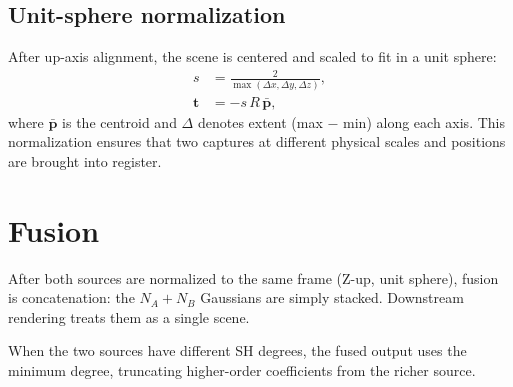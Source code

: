 \documentclass[11pt]{article}
\begin{document}
\subsection{Unit-sphere normalization}

After up-axis alignment, the scene is centered and scaled to fit in a
unit sphere:
\begin{align}
  s &= \frac{2}{\max(\Delta x, \Delta y, \Delta z)}, \\
  \mathbf{t} &= -s \, R \, \bar{\mathbf{p}},
\end{align}
where $\bar{\mathbf{p}}$ is the centroid and $\Delta$ denotes extent
(max $-$ min) along each axis. This normalization ensures that two captures
at different physical scales and positions are brought into register.

\section{Fusion}

After both sources are normalized to the same frame (Z-up, unit sphere),
fusion is concatenation: the $N_A + N_B$ Gaussians are simply stacked.
Downstream rendering treats them as a single scene.

When the two sources have different SH degrees, the fused output uses the
minimum degree, truncating higher-order coefficients from the richer source.
\end{document}
